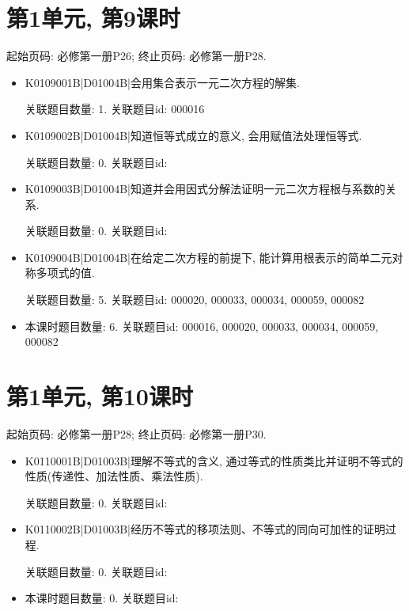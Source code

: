 \section*{第1单元, 第9课时}
起始页码: 必修第一册P26; 终止页码: 必修第一册P28.
\begin{itemize}
\item K0109001B|D01004B|会用集合表示一元二次方程的解集.

关联题目数量: 1. 关联题目id: 000016

\item K0109002B|D01004B|知道恒等式成立的意义, 会用赋值法处理恒等式.

关联题目数量: 0. 关联题目id: 

\item K0109003B|D01004B|知道并会用因式分解法证明一元二次方程根与系数的关系.

关联题目数量: 0. 关联题目id: 

\item K0109004B|D01004B|在给定二次方程的前提下, 能计算用根表示的简单二元对称多项式的值.

关联题目数量: 5. 关联题目id: 000020, 000033, 000034, 000059, 000082

\item 本课时题目数量: 6. 关联题目id: 000016, 000020, 000033, 000034, 000059, 000082

\end{itemize}

\section*{第1单元, 第10课时}
起始页码: 必修第一册P28; 终止页码: 必修第一册P30.
\begin{itemize}
\item K0110001B|D01003B|理解不等式的含义, 通过等式的性质类比并证明不等式的性质(传递性、加法性质、乘法性质).

关联题目数量: 0. 关联题目id: 

\item K0110002B|D01003B|经历不等式的移项法则、不等式的同向可加性的证明过程.

关联题目数量: 0. 关联题目id: 

\item 本课时题目数量: 0. 关联题目id: 

\end{itemize}

